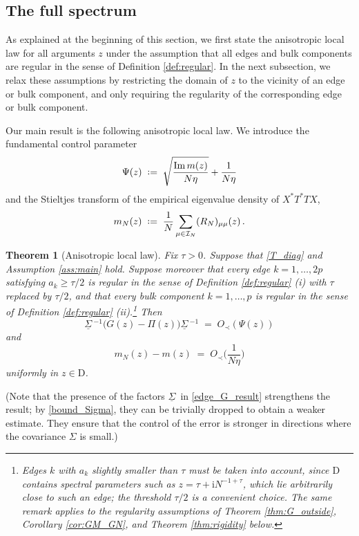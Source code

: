 \documentclass[11pt]{article} %
\numberwithin{equation}{section}
\numberwithin{figure}{section}
\theoremstyle{plain} %
\newtheorem{theorem}{Theorem}[section]
\theoremstyle{definition} %
\newcommand{\f}[1]{\boldsymbol{\mathrm{#1}}} %
\renewcommand{\cal}{\mathcal}
\newcommand{\ul}[1]{\underline{#1} \!\,} %
\newcommand{\ii}{\mathrm{i}}
\newcommand*{\deq}{\mathrel{\vcenter{\baselineskip0.65ex \lineskiplimit0pt \hbox{.}\hbox{.}}}=}
\renewcommand{\geq}{\geqslant}
\newcommand{\pb}[1]{\bigl({#1}\bigr)}
\newcommand{\pbb}[1]{\biggl({#1}\biggr)}
\DeclareMathOperator{\im}{Im}
\begin{document}
\subsection{The full spectrum} \label{sec:res_full}

As explained at the beginning of this section, we first state the anisotropic local law for all arguments $z$ under the assumption that all edges and bulk components are regular in the sense of Definition \ref{def:regular}. In the next subsection, we relax these assumptions by restricting the domain of $z$ to the vicinity of an edge or bulk component, and only requiring the regularity of the corresponding edge or bulk component.





Our main result is the following anisotropic local law. We introduce the fundamental control parameter
\begin{equation} \label{def_Psi}
\Psi(z) \;\deq\; \sqrt{\frac{\im m(z)}{N \eta}} + \frac{1}{N \eta}
\end{equation}
and the Stieltjes transform of the empirical eigenvalue density of $X^* T^* T X$,
\begin{equation} \label{def_m_N}
m_N(z) \;\deq\; \frac{1}{N} \sum_{\mu \in \cal I_N} (R_N)_{\mu \mu}(z)\,.
\end{equation}

\begin{theorem}[Anisotropic local law] \label{thm:LL_G}
Fix $\tau > 0$. Suppose that \eqref{T_diag} and Assumption \ref{ass:main} hold. Suppose moreover that every edge $k = 1, \dots, 2p$ satisfying $a_k \geq \tau/2$ is regular in the sense of Definition \ref{def:regular} (i) with $\tau$ replaced by $\tau/2$, and that every bulk component $k = 1, \dots, p$ is regular in the sense of Definition \ref{def:regular} (ii).\footnote{Edges $k$ with $a_k$ slightly smaller than $\tau$ must be taken into account, since $\f D$ contains spectral parameters such as $z = \tau + \ii N^{-1 + \tau}$, which lie arbitrarily close to such an edge; the threshold $\tau/2$ is a convenient choice. The same remark applies to the regularity assumptions of Theorem \ref{thm:G_outside}, Corollary \ref{cor:GM_GN}, and Theorem \ref{thm:rigidity} below.} Then
\begin{equation} \label{edge_G_result}
\ul \Sigma^{-1} \pb{G(z) - \Pi(z)} \ul \Sigma^{-1} \;=\; O_\prec(\Psi(z))
\end{equation}
and
\begin{equation} \label{edge_G_avg_result}
m_N(z) - m(z) \;=\; O_\prec \pbb{\frac{1}{N \eta}}
\end{equation}
uniformly in $z \in \f D$.
\end{theorem}
(Note that the presence of the factors $\ul \Sigma$ in \eqref{edge_G_result} strengthens the result; by \eqref{bound_Sigma}, they can be trivially dropped to obtain a weaker estimate. They ensure that the control of the error is stronger in directions where the covariance $\Sigma$ is small.)
\end{document}
